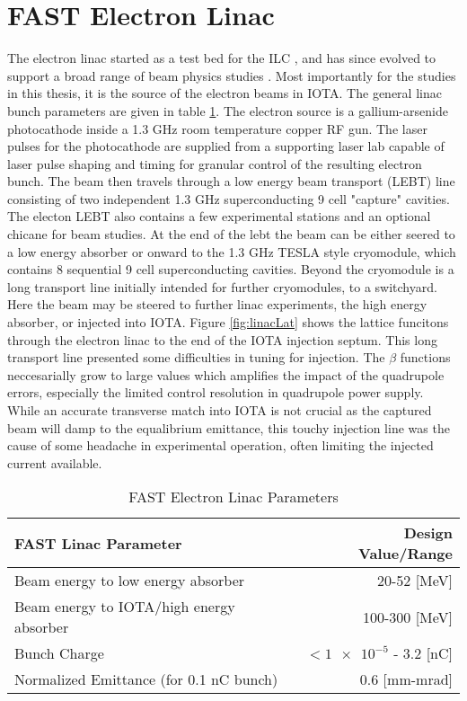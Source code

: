 \section{FAST Electron Linac}
The electron linac started as a test bed for the ILC \cite{fermiILC,recordGradient}, and has since evolved to support a broad range of beam physics studies \cite{fastGreens,NEB}. Most importantly for the studies in this thesis, it is the source of the electron beams in IOTA. The general linac bunch parameters are given in table \ref{tab:linac}. The electron source is a gallium-arsenide photocathode inside a 1.3 GHz room temperature copper RF gun. The laser pulses for the photocathode are supplied from a supporting laser lab capable of laser pulse shaping and timing for granular control of the resulting electron bunch. The beam then travels through a low energy beam transport (LEBT) line consisting of two independent 1.3 GHz superconducting 9 cell "capture" cavities. The electon LEBT also contains a few experimental stations and an optional chicane for beam studies. At the end of the lebt the beam can be either seered to a low energy absorber or onward to the 1.3 GHz TESLA style cryomodule, which contains 8 sequential 9 cell superconducting cavities. Beyond the cryomodule is a long transport line initially intended for further cryomodules, to a switchyard. Here the beam may be steered to further linac experiments, the high energy absorber, or injected into IOTA. Figure \ref{fig:linacLat} shows the lattice funcitons through the electron linac to the end of the IOTA injection septum. This long transport line presented some difficulties in tuning for injection. The $\beta$ functions neccesarially grow to large values which amplifies the impact of the quadrupole errors, especially the limited control resolution in quadrupole power supply. While an accurate transverse match into IOTA is not crucial as the captured beam will damp to the equalibrium emittance, this touchy injection line was the cause of some headache in experimental operation, often limiting the injected current available.

\begin{table}
    \centering
    \begin{tabular}{lr}
    \toprule
    \textbf{FAST Linac Parameter} & \textbf{Design Value/Range}\\
    \midrule
    Beam energy to low energy absorber & 20-52 [MeV]\\
    Beam energy to IOTA/high energy absorber & 100-300 [MeV]\\
    Bunch Charge & $<\num{1e-5}$ - 3.2 [nC]\\
    Normalized Emittance (for 0.1 nC bunch) & 0.6 [mm-mrad]\\
    \bottomrule
    \end{tabular}
    \caption{FAST Electron Linac Parameters}
    \label{tab:linac}
\end{table}

